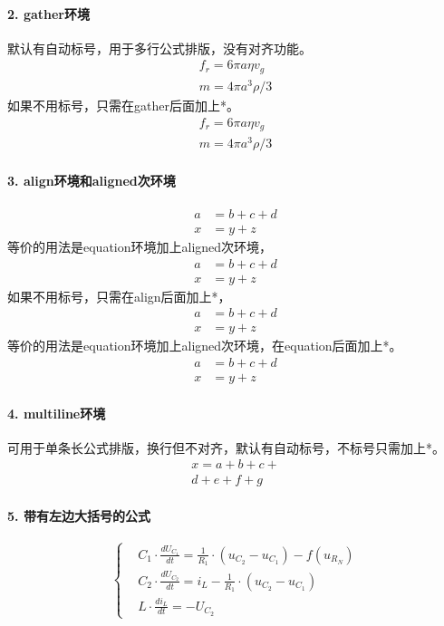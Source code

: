 \documentclass[12pt,a4paper,UTF8,fontset=fandol]{ctexart}
\begin{document}
	\paragraph*{2. gather环境}默认有自动标号，用于多行公式排版，没有对齐功能。
		\begin{gather}
		f_r=6\pi a \eta v_g   \\
		m=4 \pi a^{3} \rho / 3
		\end{gather}
		如果不用标号，只需在gather后面加上*。
		\begin{gather*}
			f_r=6\pi a \eta v_g   \\
			m=4 \pi a^{3} \rho / 3
		\end{gather*}

	\paragraph*{3. align环境和aligned次环境}
		\begin{align}
		a &= b+c+d \\
		x &= y+z
		\end{align}
		等价的用法是equation环境加上aligned次环境，
		\begin{equation}
			\begin{aligned}
			a &= b+c+d \\
			x &= y+z
			\end{aligned}
		\end{equation}
		如果不用标号，只需在align后面加上*，
		\begin{align*}
			a &= b+c+d \\
			x &= y+z
		\end{align*}
		等价的用法是equation环境加上aligned次环境，在equation后面加上*。
		\begin{equation}
			\begin{aligned}
			a &= b+c+d \\
			x &= y+z
			\end{aligned}
		\end{equation}

	\paragraph*{4. multiline环境}可用于单条长公式排版，换行但不对齐，默认有自动标号，不标号只需加上*。
		\begin{multline}
		x = a+b+c+{} \\
		d+e+f+g
		\end{multline}

	\paragraph*{5. 带有左边大括号的公式}
	\[\left\{%
		\begin{aligned}
		&C_{1} \cdot \frac{d U_{C_{1}}}{d t}=\frac{1}{R_{1}} \cdot(u_{C_{2}}-u_{C_{1}})-f(u_{R_{N}}) \\
		&C_{2} \cdot \frac{d U_{C_{2}}}{d t}=i_{L}-\frac{1}{R_{1}} \cdot(u_{C_{2}}-u_{C_{1}}) \\
		&L \cdot \frac{d i_{L}}{d t}=-U_{C_{2}}
		\end{aligned}
	   \right.
	\]
\end{document}
